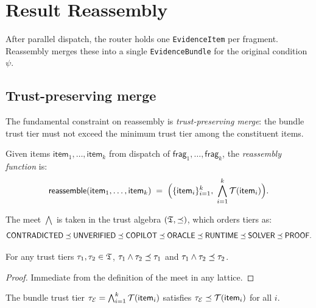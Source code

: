 \documentclass[11pt]{article}
\newcommand{\VC}{\psi}                    %
\newcommand{\Frag}[1]{\mathsf{frag}_{#1}} %
\newcommand{\Reassemble}{\mathsf{reassemble}} %
\begin{document}
\section{Result Reassembly}\label{sec:reassembly}

After parallel dispatch, the router holds one \texttt{EvidenceItem}
per fragment.  Reassembly merges these into a single
\texttt{EvidenceBundle} for the original condition $\VC$.

\subsection{Trust-preserving merge}\label{sec:trust-merge}

The fundamental constraint on reassembly is
\emph{trust-preserving merge}: the bundle trust tier must not exceed
the minimum trust tier among the constituent items.

\begin{definition}\label{def:reassembly}
Given items $\mathsf{item}_1, \ldots, \mathsf{item}_k$ from dispatch
of $\Frag{1}, \ldots, \Frag{k}$, the \emph{reassembly function} is:
\[
  \Reassemble(\mathsf{item}_1, \ldots, \mathsf{item}_k)
  \;=\;
  \Bigl(\{\mathsf{item}_i\}_{i=1}^k,\;
        \bigwedge_{i=1}^k \trust(\mathsf{item}_i)\Bigr).
\]
\end{definition}

The meet $\bigwedge$ is taken in the trust algebra
$(\mathfrak{T}, \preceq)$, which orders tiers as:
\[
  \mathsf{CONTRADICTED} \preceq \mathsf{UNVERIFIED} \preceq \mathsf{COPILOT} \preceq
  \mathsf{ORACLE} \preceq \mathsf{RUNTIME} \preceq \mathsf{SOLVER} \preceq \mathsf{PROOF}.
\]

\begin{lemma}\label{lem:meet-mono}
For any trust tiers $\tau_1, \tau_2 \in \mathfrak{T}$,
$\tau_1 \wedge \tau_2 \preceq \tau_1$ and
$\tau_1 \wedge \tau_2 \preceq \tau_2$.
\end{lemma}

\begin{proof}
Immediate from the definition of the meet in any lattice.
\end{proof}

\begin{corollary}\label{cor:bundle-trust}
The bundle trust tier $\tau_{\mathcal{E}} = \bigwedge_{i=1}^k \mathcal{T}(\mathsf{item}_i)$
satisfies $\tau_{\mathcal{E}} \preceq \mathcal{T}(\mathsf{item}_i)$ for all $i$.
\end{corollary}
\end{document}
